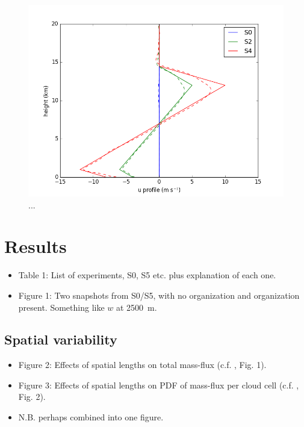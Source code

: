 \documentclass[11pt,a4paper]{article}
\newcommand*\mean[1]{\overline{#1}}
\begin{document}

\begin{figure}[htp!]
    \centering
    \includegraphics[width=450px]{figs/profile_plot.uv_profile}
    \caption{...}
    \label{fig:MC_on_off}
\end{figure}

\section{Results}
\begin{itemize}
   \item Table 1: List of experiments, S0, S5 etc. plus explanation of each one.

   \item Figure 1: Two snapshots from S0/S5, with no organization and organization present. Something like $w$ at \SI{2500}{m}.
\end{itemize}

\subsection{Spatial variability}
\begin{itemize}
    \item Figure 2: Effects of spatial lengths on total mass-flux (c.f. \cite{PC2008}, Fig. 1).
    \item Figure 3: Effects of spatial lengths on PDF of mass-flux per cloud cell (c.f. \cite{CC2006II}, Fig. 2).
    \item N.B. perhaps combined into one figure.
\end{itemize}
\end{document}
